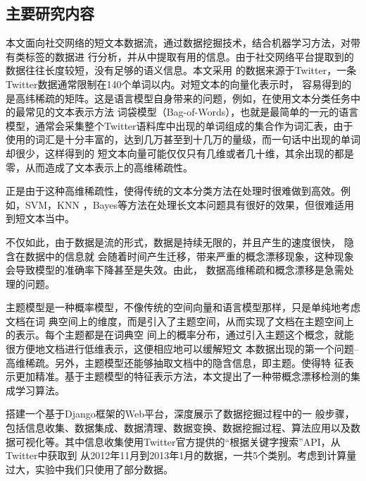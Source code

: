 \subsection{主要研究内容}
本文面向社交网络的短文本数据流，通过数据挖掘技术，结合机器学习方法，对带有类标签的数据进
 行分析，并从中提取有用的信息。由于社交网络平台提取到的数据往往长度较短，没有足够的语义信息。本文采用
 的数据来源于Twitter，一条Twitter数据通常限制在140个单词以内。对短文本的向量化表示时，
 容易得到的是高纬稀疏的矩阵。这是语言模型自身带来的问题，例如，在使用文本分类任务中的最常见的文本表示方法
词袋模型（Bag-of-Words），也就是最简单的一元的语言模型，通常会采集整个Twitter语料库中出现的单词组成的集合作为词汇表，由于使用的词汇是十分丰富的，达到几万甚至到十几万的量级，而一句话中出现的单词却很少，这样得到的
 短文本向量可能仅仅只有几维或者几十维，其余出现的都是零，从而造成了文本表示上的高维稀疏性。

正是由于这种高维稀疏性，使得传统的文本分类方法在处理时很难做到高效。例如，SVM，KNN
，Bayes等方法在处理长文本问题具有很好的效果，但很难适用到短文本当中。

不仅如此，由于数据是流的形式，数据是持续无限的，并且产生的速度很快， 隐含在数据中的信息就
会随着时间产生迁移，带来严重的概念漂移现象，这种现象会导致模型的准确率下降甚至是失效。由此，
数据高维稀疏和概念漂移是急需处理的问题。

主题模型是一种概率模型，不像传统的空间向量和语言模型那样，只是单纯地考虑文档在词
典空间上的维度，而是引入了主题空间，从而实现了文档在主题空间上的表示。每个主题都是在词典空
间上的概率分布，通过引入主题这个概念，就能很方便地文档进行低维表示，这便相应地可以缓解短文
本数据出现的第一个问题--高维稀疏。另外，主题模型还能够抽取文档中的隐含信息，即主题。使得特
征表示更加精准。基于主题模型的特征表示方法，本文提出了一种带概念漂移检测的集成学习算法。


 搭建一个基于Django框架的Web平台，深度展示了数据挖掘过程中的一
 般步骤，包括信息收集、数据集成、数据清理、数据变换、数据挖掘过程、算法应用以及数据可视化等。其中信息收集使用Twitter官方提供的“根据关键字搜索”API，从Twitter中获取到
 从2012年11月到2013年1月的数据，一共5个类别。考虑到计算量过大，实验中我们只使用了部分数据。

